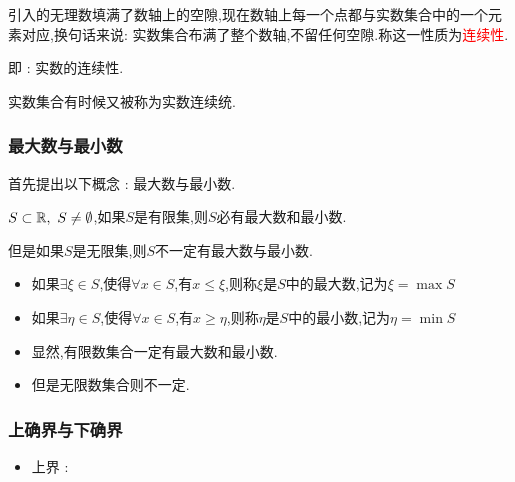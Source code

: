 {{{{\begin{itemize}
{                    引入的无理数填满了数轴上的空隙,现在数轴上每一个点都与实数集合中的一个元素对应,换句话来说: 实数集合布满了整个数轴,不留任何空隙.称这一性质为\textcolor{red}{连续性}.

                    即 : 实数的连续性.

                    实数集合有时候又被称为实数连续统.
                    }
          \end{itemize}
      }%

      \subsubsection{最大数与最小数}{
          首先提出以下概念 : 最大数与最小数.

          $S \subset \operatorname{\mathbb{R}},\ S \neq \emptyset$,如果$S$是有限集,则$S$必有最大数和最小数.

          但是如果$S$是无限集,则$S$不一定有最大数与最小数.

          \begin{itemize}
              \item 如果$\exists \xi \in S$,使得$\forall x \in S$,有$x \leq \xi$,则称$\xi$是$S$中的最大数,记为$\xi = \max S$
              \item 如果$\exists \eta \in S$,使得$\forall x \in S$,有$x \geq \eta$,则称$\eta$是$S$中的最小数,记为$\eta = \min S$
              \item 显然,有限数集合一定有最大数和最小数.
              \item 但是无限数集合则不一定.
          \end{itemize}
      }%

      \subsubsection{上确界与下确界}{
          \begin{itemize}
              \item {
                    上界 :

}
\end{itemize}}}}}
